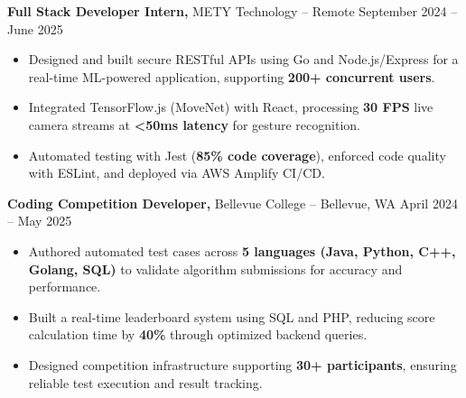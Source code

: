 \documentclass[11pt]{article}       %
\begin{document}
\textbf{Full Stack Developer Intern,} {METY Technology} -- Remote \hfill September 2024 -- June 2025 \\
\vspace{-9pt}
\begin{itemize}
  \item Designed and built secure RESTful APIs using Go and Node.js/Express for a real-time ML-powered application, supporting \textbf{200+ concurrent users}.
  \item Integrated TensorFlow.js (MoveNet) with React, processing \textbf{30 FPS} live camera streams at \textbf{<50ms latency} for gesture recognition.
  \item Automated testing with Jest (\textbf{85\% code coverage}), enforced code quality with ESLint, and deployed via AWS Amplify CI/CD.
\end{itemize}

\textbf{Coding Competition Developer,} {Bellevue College} -- Bellevue, WA \hfill April 2024 -- May 2025 \\
\vspace{-9pt}
\begin{itemize}
  \item Authored automated test cases across \textbf{5 languages (Java, Python, C++, Golang, SQL)} to validate algorithm submissions for accuracy and performance.
  \item Built a real-time leaderboard system using SQL and PHP, reducing score calculation time by \textbf{40\%} through optimized backend queries.
  \item Designed competition infrastructure supporting \textbf{30+ participants}, ensuring reliable test execution and result tracking.
\end{itemize}
\end{document}
